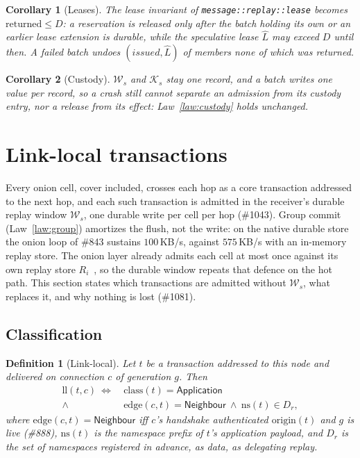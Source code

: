 \documentclass[journal]{IEEEtran}
\newtheorem{definition}{Definition}
\newtheorem{corollary}{Corollary}
\newcommand{\K}{\mathcal{K}}
\newcommand{\W}{\mathcal{W}}
\newcommand{\issue}[1]{\#{#1}}
\begin{document}
\begin{corollary}[Leases]\label{cor:grouplease}
The lease invariant of \texttt{message::replay::lease} becomes
$\mathrm{returned}\le D$: a reservation is released only after the batch holding its own
or an earlier lease extension is durable, while the speculative lease $\hat L$ may exceed
$D$ until then.  A failed batch undoes $(\mathit{issued},\hat L)$ of members none of which
was returned.
\end{corollary}

\begin{corollary}[Custody]\label{cor:groupcustody}
$\W_s$ and $\K_s$ stay one record, and a batch writes one value per record, so a crash
still cannot separate an admission from its custody entry, nor a release from its effect:
Law~\ref{law:custody} holds unchanged.
\end{corollary}

\section{Link-local transactions}\label{sec:linklocal}

Every onion cell, cover included, crosses each hop as a core transaction addressed to the
next hop, and each such transaction is admitted in the receiver's durable replay window
$\W_s$, one durable write per cell per hop (\issue{1043}).  Group commit
(Law~\ref{law:group}) amortizes the flush, not the write: on the native durable store the
onion loop of \issue{843} sustains $100$\,KB/s, against $575$\,KB/s with an in-memory
replay store.  The onion layer already admits each cell at most once against its own replay
store $R_i$~\cite{OnionPipeline}, so the durable window repeats that defence on the hot
path.  This section states which transactions are admitted without $\W_s$, what replaces it, and why
nothing is lost (\issue{1081}).

\subsection{Classification}

\begin{definition}[Link-local]\label{def:linklocal}
Let $t$ be a transaction addressed to this node and delivered on connection $c$ of
generation $g$.  Then
\begin{align*}
\mathrm{ll}(t,c)\ \Leftrightarrow\ {}&\mathrm{class}(t)=\mathsf{Application}\\
\wedge\ {}&\mathrm{edge}(c,t)=\mathsf{Neighbour}\ \wedge\ \mathrm{ns}(t)\in D_r,
\end{align*}
where $\mathrm{edge}(c,t)=\mathsf{Neighbour}$ iff $c$'s handshake authenticated
$\mathrm{origin}(t)$ and $g$ is live (\issue{888}), $\mathrm{ns}(t)$ is the namespace prefix of
$t$'s application payload, and $D_r$ is the set of namespaces registered in advance, as
data, as \emph{delegating replay}.
\end{definition}
\end{document}
